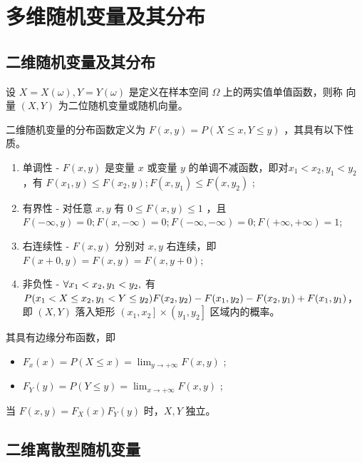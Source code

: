 \chapter{多维随机变量及其分布}

\section{二维随机变量及其分布}

\begin{Def}[二维随机变量]

    设 $ X = X(\omega),Y=Y(\omega) $ 是定义在样本空间 $ \Omega $ 上的两实值单值函数，则称
    向量 $ (X,Y) $ 为二位随机变量或随机向量。
\end{Def}

二维随机变量的分布函数定义为 $ F(x,y) = P(X\leq x, Y\leq y) $ ，其具有以下性质。

\begin{enumerate}
    \item 单调性 - $ F(x,y) $ 是变量 $ x $ 或变量 $ y $ 的单调不减函数，即对$ x_1 < x_2, y_1<y_2 $，有
    $ F(x_1,y)\leq F(x_2,y);F(x,y_1)\leq F(x,y_2) $ ;
    \item 有界性 - 对任意 $ x,y $ 有 $ 0\leq F(x,y)\leq 1 $ ，且
    $ F(-\infty,y) = 0; F(x,-\infty) = 0; F(-\infty,-\infty) = 0; F(+\infty,+\infty) = 1 $;
    \item 右连续性 -  $ F(x,y) $ 分别对 $ x,y $ 右连续，即
    $ F(x+0,y) = F(x,y) = F(x,y+0) $;
    \item 非负性 - $ \displaystyle \forall x_1 < x_2, y_1 < y_2, $ 有
    $ \displaystyle P(x_1< X\leq x_2,y_1<Y\leq y_2) F(x_2,y_2) - F(x_1,y_2) - F(x_2,y_1)+F(x_1,y_1) $，即
    $ (X,Y) $ 落入矩形 $ \left(x_1,x_2\right]\times \left(y_1,y_2\right] $ 区域内的概率。
\end{enumerate}

其具有边缘分布函数，即
\begin{itemize}
    \item $ F_x(x) = P(X\leq x) = {\displaystyle\lim_{y\rightarrow +\infty}}F(x,y) $ ;
    \item $ F_Y(y) = P(Y\leq y) = {\displaystyle\lim_{x\rightarrow +\infty}}F(x,y) $ ;
\end{itemize}

当 $ F(x,y) = F_X(x)F_Y(y) $ 时，$ X,Y $ 独立。

\section{二维离散型随机变量}

